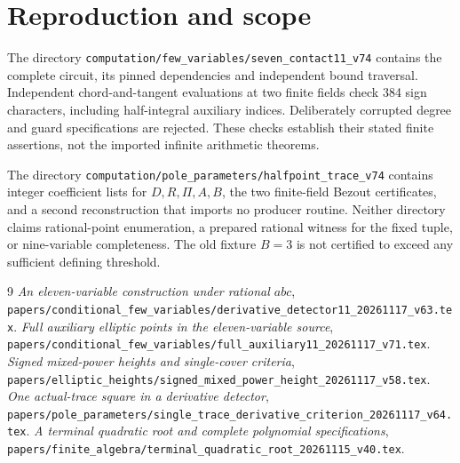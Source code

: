 \documentclass[11pt,a4paper]{article}
\begin{document}
\section{Reproduction and scope}
The directory
\nolinkurl{computation/few_variables/seven_contact11_v74}
contains the complete circuit, its pinned dependencies and independent
bound traversal. Independent chord-and-tangent evaluations at two
finite fields check 384 sign characters, including half-integral
auxiliary indices. Deliberately corrupted degree and guard specifications
are rejected. These checks establish their stated finite assertions,
not the imported infinite arithmetic theorems.

The directory
\nolinkurl{computation/pole_parameters/halfpoint_trace_v74}
contains integer coefficient lists for $D,R,\Pi,A,B$, the two
finite-field Bezout certificates, and a second reconstruction that
imports no producer routine. Neither directory claims rational-point
enumeration, a prepared rational witness for the fixed tuple, or
nine-variable completeness. The old fixture $B=3$ is not certified to
exceed any sufficient defining threshold.

\begin{thebibliography}{9}
\emph{An eleven-variable construction under rational $abc$},
\nolinkurl{papers/conditional_few_variables/derivative_detector11_20261117_v63.tex}.
\emph{Full auxiliary elliptic points in the eleven-variable source},
\nolinkurl{papers/conditional_few_variables/full_auxiliary11_20261117_v71.tex}.
\emph{Signed mixed-power heights and single-cover criteria},
\nolinkurl{papers/elliptic_heights/signed_mixed_power_height_20261117_v58.tex}.
\emph{One actual-trace square in a derivative detector},
\nolinkurl{papers/pole_parameters/single_trace_derivative_criterion_20261117_v64.tex}.
\emph{A terminal quadratic root and complete polynomial specifications},
\nolinkurl{papers/finite_algebra/terminal_quadratic_root_20261115_v40.tex}.
\end{thebibliography}
\end{document}

